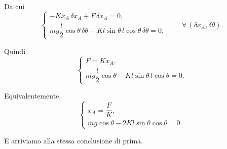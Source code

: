 \begin{example}{}
Da cui
\[
\left\{
\begin{array}{l}
-Kx_A\,\delta x_A
+
F\,\delta x_A
=
0,
\\[2mm]
mg\dfrac{l}{2}\cos\theta\,\delta\theta
-
Kl\sin\theta\,l\cos\theta\,\delta\theta
=
0,
\end{array}
\right.
\qquad
\forall\,(\delta x_A,\delta\theta).
\]

Quindi
\[
\left\{
\begin{array}{l}
F=Kx_A,
\\[2mm]
mg\dfrac{l}{2}\cos\theta
-
Kl\sin\theta\,l\cos\theta
=
0.
\end{array}
\right.
\]

Equivalentemente,
\[
\left\{
\begin{array}{l}
x_A=\dfrac{F}{K},
\\[3mm]
mg\cos\theta
-
2Kl\sin\theta\cos\theta
=
0.
\end{array}
\right.
\]

E arriviamo alla stessa conclusione di prima.
\end{example}
